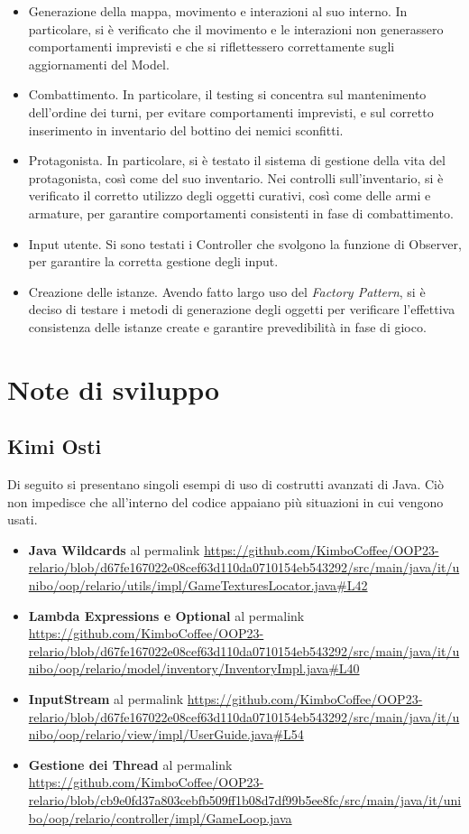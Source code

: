 \documentclass[a4paper,12pt]{report}
\begin{document}
\begin{itemize}
	\item Generazione della mappa, movimento e interazioni al suo interno. In particolare, si è verificato che il movimento e le interazioni non generassero comportamenti imprevisti e che si riflettessero correttamente sugli aggiornamenti del Model.
	\item Combattimento. In particolare, il testing si concentra sul mantenimento dell’ordine dei turni, per evitare comportamenti imprevisti, e sul corretto inserimento in inventario del bottino dei nemici sconfitti.
	\item Protagonista. In particolare, si è testato il sistema di gestione della vita del protagonista, così come del suo inventario. Nei controlli sull’inventario, si è verificato il corretto utilizzo degli oggetti curativi, così come delle armi e armature, per garantire comportamenti consistenti in fase di combattimento.
	\item Input utente. Si sono testati i Controller che svolgono la funzione di Observer, per garantire la corretta gestione degli input.
	\item Creazione delle istanze. Avendo fatto largo uso del \textit{Factory Pattern}, si è deciso di testare i metodi di generazione degli oggetti per verificare l’effettiva consistenza delle istanze create e garantire prevedibilità in fase di gioco.
\end{itemize}

\section{Note di sviluppo}

\subsection{Kimi Osti}

Di seguito si presentano singoli esempi di uso di costrutti avanzati di Java. Ciò non impedisce che all'interno del codice appaiano più situazioni in cui vengono usati.
\begin{itemize}
	\item \textbf{Java Wildcards} al permalink \url{https://github.com/KimboCoffee/OOP23-relario/blob/d67fe167022e08cef63d110da0710154eb543292/src/main/java/it/unibo/oop/relario/utils/impl/GameTexturesLocator.java#L42}
	\item \textbf{Lambda Expressions e Optional} al permalink \url{https://github.com/KimboCoffee/OOP23-relario/blob/d67fe167022e08cef63d110da0710154eb543292/src/main/java/it/unibo/oop/relario/model/inventory/InventoryImpl.java#L40}
	\item \textbf{InputStream} al permalink \url{https://github.com/KimboCoffee/OOP23-relario/blob/d67fe167022e08cef63d110da0710154eb543292/src/main/java/it/unibo/oop/relario/view/impl/UserGuide.java#L54}
	\item \textbf{Gestione dei Thread} al permalink \url{https://github.com/KimboCoffee/OOP23-relario/blob/cb9e0fd37a803cebfb509ff1b08d7df99b5ee8fc/src/main/java/it/unibo/oop/relario/controller/impl/GameLoop.java}
\end{itemize}
\end{document}
